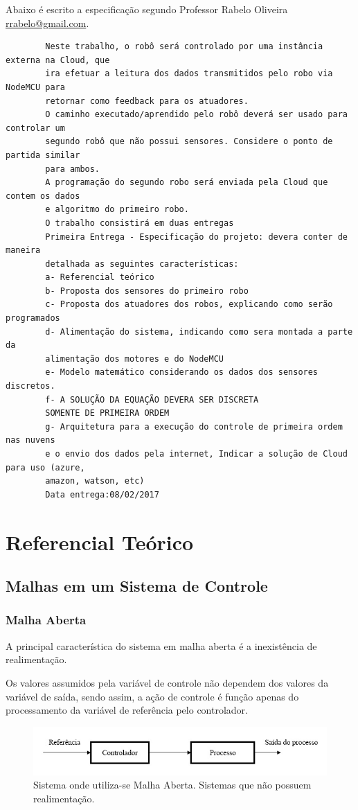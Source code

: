 \documentclass[portugues, brazil, a4paper,12pt]{article}
\begin{document}
	Abaixo é escrito a especificação segundo Professor Rabelo Oliveira \href{mailto:rrabelo@gmail.com}{rrabelo@gmail.com}.
	\begin{verbatim}
		Neste trabalho, o robô será controlado por uma instância externa na Cloud, que
		ira efetuar a leitura dos dados transmitidos pelo robo via NodeMCU para
		retornar como feedback para os atuadores.
		O caminho executado/aprendido pelo robô deverá ser usado para controlar um
		segundo robô que não possui sensores. Considere o ponto de partida similar
		para ambos.
		A programação do segundo robo será enviada pela Cloud que contem os dados
		e algoritmo do primeiro robo.
		O trabalho consistirá em duas entregas
		Primeira Entrega - Especificação do projeto: devera conter de maneira
		detalhada as seguintes características:
		a- Referencial teórico
		b- Proposta dos sensores do primeiro robo
		c- Proposta dos atuadores dos robos, explicando como serão programados
		d- Alimentação do sistema, indicando como sera montada a parte da
		alimentação dos motores e do NodeMCU
		e- Modelo matemático considerando os dados dos sensores discretos.
		f- A SOLUÇÃO DA EQUAÇÃO DEVERA SER DISCRETA
		SOMENTE DE PRIMEIRA ORDEM
		g- Arquitetura para a execução do controle de primeira ordem nas nuvens
		e o envio dos dados pela internet, Indicar a solução de Cloud para uso (azure,
		amazon, watson, etc)
		Data entrega:08/02/2017
	\end{verbatim}


\section{Referencial Teórico} \label{sec:rt}


	\subsection{Malhas em um Sistema de Controle}


		\subsubsection{Malha Aberta}
			A principal característica do sistema em malha aberta é a inexistência de  realimentação.

			Os  valores  assumidos  pela  variável de  controle  não  dependem dos  valores  da  variável  de saída, sendo assim, a  ação  de  controle  é  função  apenas  do processamento da variável de referência pelo controlador.

			\begin{figure}[H]
				\centering
				\includegraphics[width=\linewidth]{img/rf-malha_aberta.jpg}
				\caption{Sistema onde utiliza-se Malha Aberta. Sistemas que não possuem realimentação.}
				\label{fig:malha_aberta}
			\end{figure}
\end{document}
